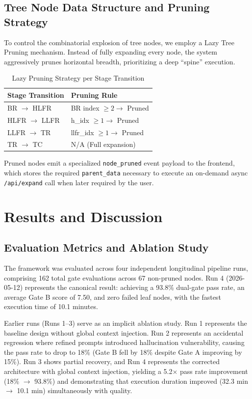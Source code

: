\documentclass[journal]{IEEEtran}
\begin{document}
\subsection{Tree Node Data Structure and Pruning Strategy}
To control the combinatorial explosion of tree nodes, we employ a Lazy Tree Pruning mechanism. Instead of fully expanding every node, the system aggressively prunes horizontal breadth, prioritizing a deep ``spine'' execution. 

\begin{table}[ht]
\centering
\caption{Lazy Pruning Strategy per Stage Transition}
\label{tab:pruning}
\begin{tabular}{@{}ll@{}}
\toprule
\textbf{Stage Transition} & \textbf{Pruning Rule} \\ \midrule
BR $\rightarrow$ HLFR & BR index $\ge 2 \rightarrow$ Pruned \\
HLFR $\rightarrow$ LLFR & h\_idx $\ge 1 \rightarrow$ Pruned \\
LLFR $\rightarrow$ TR & llfr\_idx $\ge 1 \rightarrow$ Pruned \\
TR $\rightarrow$ TC & N/A (Full expansion) \\
\bottomrule
\end{tabular}
\end{table}

Pruned nodes emit a specialized \texttt{node\_pruned} event payload to the frontend, which stores the required \texttt{parent\_data} necessary to execute an on-demand async \texttt{/api/expand} call when later required by the user.

\section{Results and Discussion}

\subsection{Evaluation Metrics and Ablation Study}
The framework was evaluated across four independent longitudinal pipeline runs, comprising 162 total gate evaluations across 67 non-pruned nodes. Run 4 (2026-05-12) represents the canonical result: achieving a 93.8\% dual-gate pass rate, an average Gate B score of 7.50, and zero failed leaf nodes, with the fastest execution time of 10.1 minutes. 

Earlier runs (Runs 1--3) serve as an implicit ablation study. Run 1 represents the baseline design without global context injection. Run 2 represents an accidental regression where refined prompts introduced hallucination vulnerability, causing the pass rate to drop to 18\% (Gate B fell by 18\% despite Gate A improving by 15\%). Run 3 shows partial recovery, and Run 4 represents the corrected architecture with global context injection, yielding a 5.2$\times$ pass rate improvement (18\% $\rightarrow$ 93.8\%) and demonstrating that execution duration improved (32.3 min $\rightarrow$ 10.1 min) simultaneously with quality.
\end{document}

